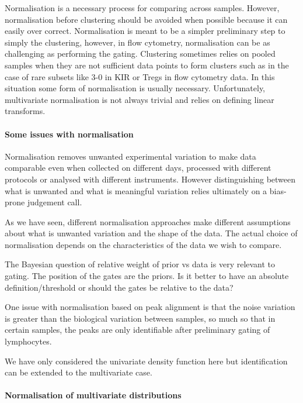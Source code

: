 Normalisation is a necessary process for comparing across samples.
However, normalisation before clustering should be avoided when possible because 
it can easily over correct.
Normalisation is meant to be a simpler preliminary step to simply the clustering, however, in flow cytometry,
normalisation can be as challenging as performing the gating.
Clustering sometimes relies on pooled samples when they are not sufficient data points
to form clusters such as in the case of rare subsets like 3-0 in KIR or Tregs in flow cytometry data.
In this situation some form of normalisation is usually necessary.
Unfortunately, multivariate normalisation is not always trivial and relies on defining linear transforms. 



\paragraph{Some issues with normalisation}

Normalisation removes unwanted experimental variation to make data comparable even when collected on different days,
processed with different protocols or analysed with different instruments.
However distinguishing between what is unwanted and what is meaningful variation relies ultimately on a bias-prone judgement call.

As we have seen, different normalisation approaches make different assumptions about what is unwanted variation and the shape of the data.
The actual choice of normalisation depends on the characteristics of the data we wish to compare.

The Bayesian question of relative weight of prior vs data is very relevant to gating.
The position of the gates are the priors. Is it better to have an absolute definition/threshold or should the gates be relative to the data?
 
One issue with normalisation based on peak alignment is that the noise variation is greater than the biological variation between samples, so much so that in certain samples, the peaks are only identifiable after preliminary gating of lymphocytes.

We have only considered the univariate density function here but identification can be extended to the multivariate case.

\paragraph{Normalisation of multivariate distributions}

